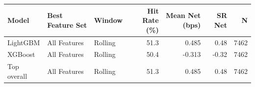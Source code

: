 \begin{tabular}{lllrrrr}
\toprule
Model & Best Feature Set & Window & Hit Rate (\%) & Mean Net (bps) & SR Net & N \\
\midrule
LightGBM & All Features & Rolling & 51.3 & 0.485 & 0.48 & 7462 \\
XGBoost & All Features & Rolling & 50.4 & -0.313 & -0.32 & 7462 \\
\midrule
Top overall & All Features & Rolling & 51.3 & 0.485 & 0.48 & 7462 \\
\bottomrule
\end{tabular}
